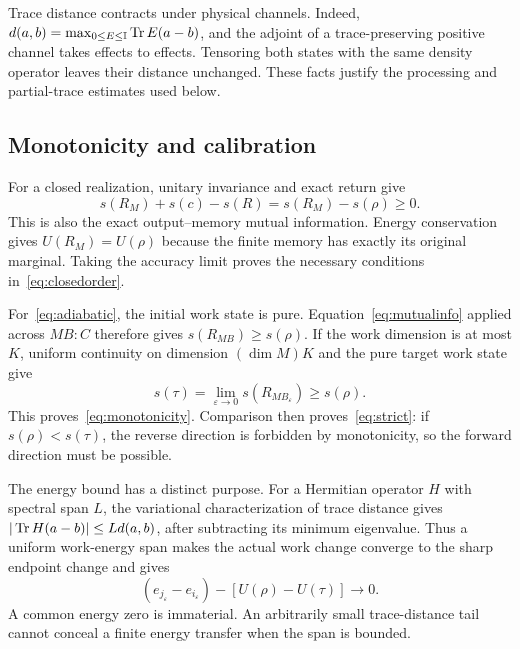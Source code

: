 Trace distance contracts under physical channels. Indeed, $d(a,b)=\max_{0\le E\le\mathbb{I}}\operatorname{Tr} E(a-b)$, and the adjoint of a trace-preserving positive channel takes effects to effects. Tensoring both states with the same density operator leaves their distance unchanged. These facts justify the processing and partial-trace estimates used below.

\subsection{Monotonicity and calibration}
For a closed realization, unitary invariance and exact return give
\[
 s(R_M)+s(c)-s(R)=s(R_M)-s(\rho)\ge0.
\]
This is also the exact output--memory mutual information. Energy conservation gives $U(R_M)=U(\rho)$ because the finite memory has exactly its original marginal. Taking the accuracy limit proves the necessary conditions in~\eqref{eq:closedorder}.

For~\eqref{eq:adiabatic}, the initial work state is pure. Equation~\eqref{eq:mutualinfo} applied across $MB:C$ therefore gives $s(R_{MB})\ge s(\rho)$. If the work dimension is at most $K$, uniform continuity on dimension $(\dim M)K$ and the pure target work state give
\[
 s(\tau)=\lim_{\varepsilon\to0}s(R_{MB_\varepsilon})\ge s(\rho).
\]
This proves~\eqref{eq:monotonicity}. Comparison then proves~\eqref{eq:strict}: if $s(\rho)<s(\tau)$, the reverse direction is forbidden by monotonicity, so the forward direction must be possible.

The energy bound has a distinct purpose. For a Hermitian operator $H$ with spectral span $L$, the variational characterization of trace distance gives $|\operatorname{Tr} H(a-b)|\le Ld(a,b)$, after subtracting its minimum eigenvalue. Thus a uniform work-energy span makes the actual work change converge to the sharp endpoint change and gives
\[
 (e_{j_\varepsilon}-e_{i_\varepsilon})-[U(\rho)-U(\tau)]\longrightarrow0.
\]
A common energy zero is immaterial. An arbitrarily small trace-distance tail cannot conceal a finite energy transfer when the span is bounded.

